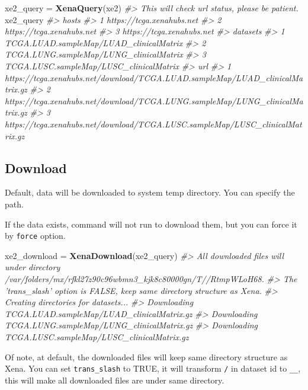 \documentclass[nofonts,]{tufte-handout}
\newenvironment{Shaded}{\begin{snugshade}}{\end{snugshade}}
\newcommand{\CommentTok}[1]{\textcolor[rgb]{0.56,0.35,0.01}{\textit{#1}}}
\newcommand{\KeywordTok}[1]{\textcolor[rgb]{0.13,0.29,0.53}{\textbf{#1}}}
\newcommand{\NormalTok}[1]{#1}
\newcommand{\StringTok}[1]{\textcolor[rgb]{0.31,0.60,0.02}{#1}}
\begin{document}
\begin{Shaded}
\begin{Highlighting}[]
\NormalTok{xe2_query =}\StringTok{ }\KeywordTok{XenaQuery}\NormalTok{(xe2)}
\CommentTok{#> This will check url status, please be patient.}
\NormalTok{xe2_query}
\CommentTok{#>                       hosts}
\CommentTok{#> 1 https://tcga.xenahubs.net}
\CommentTok{#> 2 https://tcga.xenahubs.net}
\CommentTok{#> 3 https://tcga.xenahubs.net}
\CommentTok{#>                                  datasets}
\CommentTok{#> 1 TCGA.LUAD.sampleMap/LUAD_clinicalMatrix}
\CommentTok{#> 2 TCGA.LUNG.sampleMap/LUNG_clinicalMatrix}
\CommentTok{#> 3 TCGA.LUSC.sampleMap/LUSC_clinicalMatrix}
\CommentTok{#>                                                                             url}
\CommentTok{#> 1 https://tcga.xenahubs.net/download/TCGA.LUAD.sampleMap/LUAD_clinicalMatrix.gz}
\CommentTok{#> 2 https://tcga.xenahubs.net/download/TCGA.LUNG.sampleMap/LUNG_clinicalMatrix.gz}
\CommentTok{#> 3 https://tcga.xenahubs.net/download/TCGA.LUSC.sampleMap/LUSC_clinicalMatrix.gz}
\end{Highlighting}
\end{Shaded}

\hypertarget{download}{%
\subsection{Download}\label{download}}

Default, data will be downloaded to system temp directory. You can
specify the path.

If the data exists, command will not run to download them, but you can
force it by \texttt{force} option.

\begin{Shaded}
\begin{Highlighting}[]
\NormalTok{xe2_download =}\StringTok{ }\KeywordTok{XenaDownload}\NormalTok{(xe2_query)}
\CommentTok{#> All downloaded files will under directory /var/folders/mx/rfkl27z90c96wbmn3_kjk8c80000gn/T//RtmpWLoH68.}
\CommentTok{#> The 'trans_slash' option is FALSE, keep same directory structure as Xena.}
\CommentTok{#> Creating directories for datasets...}
\CommentTok{#> Downloading TCGA.LUAD.sampleMap/LUAD_clinicalMatrix.gz}
\CommentTok{#> Downloading TCGA.LUNG.sampleMap/LUNG_clinicalMatrix.gz}
\CommentTok{#> Downloading TCGA.LUSC.sampleMap/LUSC_clinicalMatrix.gz}
\end{Highlighting}
\end{Shaded}

Of note, at default, the downloaded files will keep same directory
structure as Xena. You can set \texttt{trans\_slash} to TRUE, it will
transform \texttt{/} in dataset id to \texttt{\_\_}, this will make all
downloaded files are under same directory.
\end{document}
